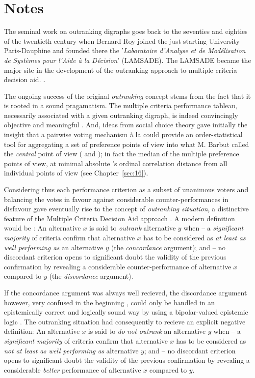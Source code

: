 \section*{Notes}

The seminal work on outranking digraphs goes back to the seventies and eighties of the twentieth century when Bernard Roy  joined the just starting University Paris-Dauphine and founded there the '\emph{Laboratoire d’Analyse et de Modélisation de Systèmes pour l’Aide à la Décision}' (LAMSADE). The LAMSADE became the major site in the development of the outranking approach to multiple criteria decision aid. \citep*{ROY-1993}.

The ongoing success of the original \emph{outranking} concept stems from the fact that it is rooted in a sound pragamatism. The multiple criteria performance tableau, necessarily associated with a given outranking digraph, is indeed convincingly objective and meaningful \citep{ROY-1991}. And, ideas from social choice theory gave initially the insight that a pairwise voting mechanism à la \Condorcet could provide an order-statistical tool for aggregating a set of preference points of view into what M. Barbut called the \emph{central} \Condorcet point of view (\citet{CON-1784} and \citet{BAR-1980}); in fact the median of the multiple preference points of view, at minimal absolute \Kendall's ordinal correlation distance from all individual points of view (see Chapter~\ref{sec:16}).

Considering thus each performance criterion as a subset of unanimous voters and balancing the votes in favour against considerable counter-performances in disfavour gave eventually rise to the concept of \emph{outranking situation}, a distinctive feature of the Multiple Criteria Decision Aid approach \citep{BIS-2015}.  A modern definition would be : An alternative $x$ is said to \emph{outrank} alternative $y$ when – a \emph{significant majority} of criteria confirm that alternative $x$ has to be considered as \emph{at least as well performing as} an alternative $y$ (the \emph{concordance} argument); and – no discordant criterion opens to significant doubt the validity of the previous confirmation by revealing a considerable counter-performance of alternative $x$ compared to $y$ (the \emph{discordance} argument).

If the concordance argument was always well recieved, the discordance argument however, very confused in the beginning \citep{ROY-1966}, could only be handled in an epistemically correct and logically sound way by using a bipolar-valued epistemic logic \citep{BIS-2013}. The outranking situation had consequently to recieve an explicit negative definition: An alternative $x$ is said to \emph{do not outrank} an alternative $y$ when – a \emph{significant majority} of criteria confirm that alternative $x$ has to be considered as \emph{not at least as well performing as} alternative $y$; and – no discordant criterion opens to significant doubt the validity of the previous confirmation by revealing a considerable \emph{better} performance of alternative $x$ compared to $y$.

